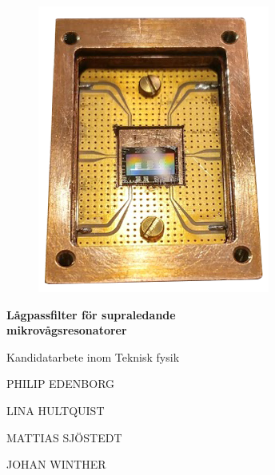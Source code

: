 \documentclass[../../main.tex]{subfiles}
\begin{document}
\begin{titlepage}
			
\addtolength{\voffset}{2cm}

\begin{figure}[H]
\centering
\vspace{2cm}	%
\includegraphics[width=0.5\linewidth]{figure/auxiliary/front_image.png}
\end{figure}

\renewcommand{\familydefault}{\sfdefault} \normalfont %
\textbf{{\Huge Lågpassfilter för supraledande \\mikrovågsresonatorer}}

{\Large \undertitel}

Kandidatarbete inom Teknisk fysik
\setlength{\parskip}{0.5cm}

{\Large PHILIP EDENBORG

\setlength{\parskip}{0em}
LINA HULTQUIST

MATTIAS SJÖSTEDT

JOHAN WINTHER

}

\setlength{\parskip}{1cm}

\department\\
\textsc{\university} \\
\adress

\renewcommand{\familydefault}{\rmdefault} \normalfont %
\end{titlepage}
\end{document}
